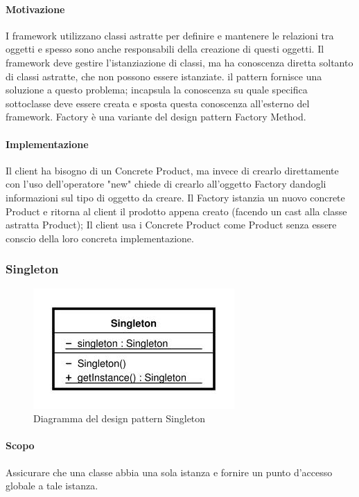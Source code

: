 \paragraph{Motivazione\\}
I framework\glossario{} utilizzano classi astratte per definire e mantenere le relazioni tra oggetti e spesso sono anche responsabili della creazione di questi oggetti. Il framework\glossario{} deve gestire l'istanziazione di classi, ma ha conoscenza diretta soltanto di classi astratte, che non possono essere istanziate. il pattern fornisce una soluzione a questo problema; incapsula la conoscenza su quale specifica sottoclasse deve essere creata e sposta questa conoscenza all'esterno del framework\glossario{}. Factory è una variante del design pattern\glossario{} Factory Method.

\paragraph{Implementazione\\}
Il client ha bisogno di un Concrete Product, ma invece di crearlo direttamente con l'uso dell'operatore "new" chiede di crearlo all'oggetto Factory dandogli informazioni sul tipo di oggetto da creare.
Il Factory istanzia un nuovo concrete Product e ritorna al client il prodotto appena creato (facendo un cast alla classe astratta Product);
Il client usa i Concrete Product come Product senza essere conscio della loro concreta implementazione.
\pagebreak

\subsubsection{Singleton}
\label{single}
\begin{figure} [!h]
	\centering
	\includegraphics[width=0.43\linewidth]{./Content/Immagini/singleton.jpg}
	\caption{Diagramma del design pattern Singleton}
	\label{figSing}
\end{figure}

\paragraph{Scopo\\}
Assicurare che una classe abbia una sola istanza e fornire un punto d'accesso globale a tale istanza.

